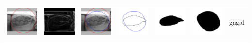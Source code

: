 \begin{table}[H]
\begin{tabular}{|m{0.7in}|m{0.7in}|m{0.7in}|m{0.7in}|m{0.7in}|m{0.7in}|m{0.7in}|}
		&  &  & & & &  \\
		\includegraphics[width=0.7in]{dataset/dataset_3/luka_merah/ready/19_interp_init.jpg}&
		\includegraphics[width=0.7in]{dataset/dataset_3/luka_merah/ready/19_interp_ext.jpg}&
		\includegraphics[width=0.7in]{dataset/dataset_3/luka_merah/ready/19_interp_result.jpg}&
		\includegraphics[width=0.7in]{dataset/dataset_3/luka_merah/ready/19_gt_r.jpg}&
		\includegraphics[width=0.7in]{dataset/dataset_3/luka_merah/ready/19_r.jpg}&
		\includegraphics[width=0.7in]{dataset/dataset_3/luka_merah/ready/19_interp_r.jpg}&
		gagal\\
		\hline
		

\end{tabular}
\end{table}
